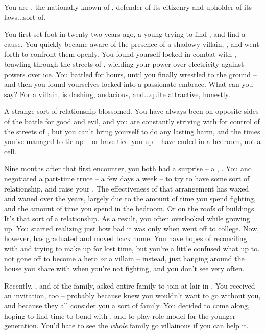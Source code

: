 \documentclass[char]{LRSguildcamp1}
\begin{document}
\name{\cOS{}}
You are \cOS{\intro}, the nationally-known \cOS{\hero} of \pCityO{}, defender of its citizenry and upholder of its laws...sort of.

You first set foot in \pCityO{} twenty-two years ago, a young \cOS{\hero} trying to find \cOS{\themself}, and find a cause.  You quickly became aware of the presence of a shadowy villain, \cOldest{\intro}, and went forth to confront them openly.  You found yourself locked in combat with \cOS{}, brawling through the streets of \pCityO{}, wielding your power over electricity against \cOldest{\their} powers over ice.  You battled for hours, until you finally wrestled \cOldest{\them} to the ground -- and then you found yourselves locked into a passionate embrace.  What can you say?  For a villain, \cOldest{} is dashing, audacious, and...quite attractive, honestly.

A strange sort of relationship blossomed.  You have always been on opposite sides of the battle for good and evil, and you are constantly striving with \cOS{\them} for control of the streets of \pCityO{}, but you can't bring yourself to do \cOS{\them} any lasting harm, and the times you've managed to tie \cOS{\them} up -- or \cOS{\they} have tied you up -- have ended in a bedroom, not a cell.

Nine months after that first encounter, you both had a surprise -- a \cGrad{\offspring}, \cGrad{\intro}.  You and \cOldest{} negotiated a part-time truce -- a few days a week -- to try to have some sort of relationship, and raise your \cGrad{\offspring}.  The effectiveness of that arrangement has waxed and waned over the years, largely due to the amount of time you spend fighting, and the amount of time you spend in the bedroom.  Or on the roofs of buildings.  It's that sort of a relationship.  As a result, you often overlooked \cGrad{} while \cGrad{\theywere} growing up.  You started realizing just how bad it was only when \cGrad{} went off to college.  Now, however, \cGrad{} has graduated and moved back home.  You have hopes of reconciling with \cGrad{\them} and trying to make up for lost time, but you're a little confused what \cGrad{\theyare} up to.  \cGrad{\Theyhave} not gone off to become a hero \emph{or} a villain -- instead, \cGrad{\theyare} just hanging around the house you share with \cOS{} when you're not fighting, and you don't see \cGrad{\them} very often.

Recently, \cGrandma{\intro}, \cGrandma{\villain} and \cGrandma{\familyleader} of the  family, asked \cGrandma{\their} entire family to join \cGrandma{\them} at \cGrandma{\their} lair in \pCityGrandma{}.  You received an invitation, too -- probably because \cGrandma{\they} knew you wouldn't want \cGrad{} to go without you, and because they all consider you a sort of family.  You decided to come along, hoping to find time to bond with \cGrad{}, and to play role model for the younger generation.  You'd hate to see the \emph{whole} family go villainous if you can help it.
\end{document}
